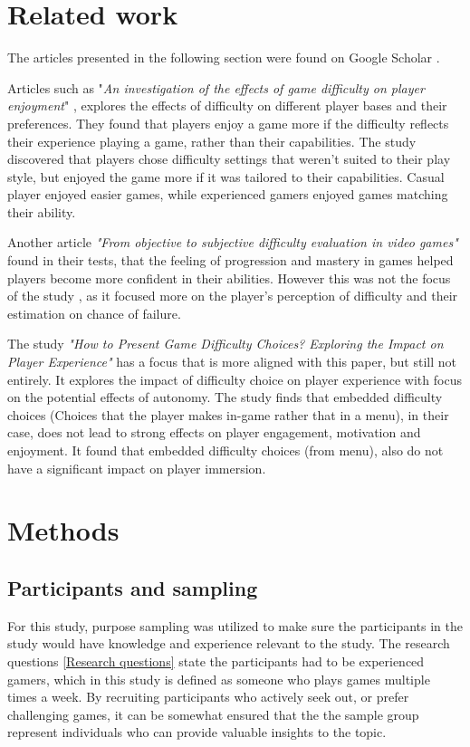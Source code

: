 \section{Related work}

The articles presented in the following section were found on Google Scholar \cite{noauthor_google_nodate}.

Articles such as "\textit{An investigation of the effects of game difficulty on player enjoyment}" \cite{justin_t_alexander_investigation_2025}, explores the effects of difficulty on different player bases and their preferences. They found that players enjoy a game more if the difficulty reflects their experience playing a game, rather than their capabilities. The study discovered that players chose difficulty settings that weren't suited to their play style, but enjoyed the game more if it was tailored to their capabilities. Casual player enjoyed easier games, while experienced gamers enjoyed games matching their ability.

Another article \textit{"From objective to subjective difficulty evaluation in video games"}\cite{constant_objective_2017} found in their tests, that the feeling of progression and mastery in games helped players become more confident in their abilities. However this was not the focus of the study \cite{constant_objective_2017}, as it focused more on the player's perception of difficulty and their estimation on chance of failure. 

The study \textit{"How to Present Game Difficulty Choices? Exploring the Impact on Player Experience"} \cite{jan_d_smeddinck_how_2016} has a focus that is more aligned with this paper, but still not entirely. It explores the impact of difficulty choice on player experience with focus on the potential effects of autonomy. The study finds that embedded difficulty choices (Choices that the player makes in-game rather that in a menu), in their case, does not lead to strong effects on player engagement, motivation and enjoyment. It found that embedded difficulty choices (from menu), also do not have a significant impact on player immersion. 

\section{Methods}

\subsection{Participants and sampling}
For this study, purpose sampling was utilized to make sure the participants in the study would have knowledge and experience relevant to the study. The research questions \ref{Research questions} state the participants had to be experienced gamers, which in this study is defined as someone who plays games multiple times a week. By recruiting participants who actively seek out, or prefer challenging games, it can be somewhat ensured that the the sample group represent individuals who can provide valuable insights to the topic.

